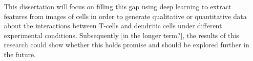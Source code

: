 This dissertation will focus on filling this gap using deep learning to extract features from images of cells in order to generate qualitative or quantitative data about the interactions between T-cells and dendritic cells under different experimental conditions. Subsequently [in the longer term?], the results of this research could show whether this holds promise and should be explored further in the future.
